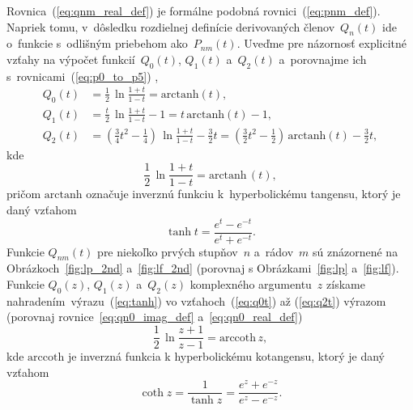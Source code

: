 \documentclass[a4paper, 12pt]{book}
\begin{document}
Rovnica~(\ref{eq:qnm_real_def}) je formálne podobná rovnici~(\ref{eq:pnm_def}).  
Napriek tomu, v~dôsledku rozdielnej definície derivovaných členov~$Q_n(t)$ ide 
o~funkcie s~odlišným priebehom ako~$P_{nm}(t)$.  Uveďme pre názornosť 
explicitné vzťahy na výpočet funkcií~$Q_0\left( t \right)$, $Q_1\left( 
t \right)$ a~$Q_2\left( t \right)$ a~porovnajme ich 
s~rovnicami~(\ref{eq:p0_to_p5})
\parencite{MoritzPhysicalGeodesy},
%
\begin{align}
\label{eq:q0t}
Q_0(t) &= \frac{1}{2} \, \ln\frac{1 + t}{1 - t} = \mathrm{arctanh}(t){,}\\
%
\label{eq:q1t}
Q_1(t) &= \frac{t}{2} \, \ln\frac{1 + t}{1 - t} - 1 = t \, \mathrm{arctanh}(t)- 
 1{,}\\
%
\label{eq:q2t}
Q_2(t) &= \left( \frac{3}{4} t^2 - \frac{1}{4} \right) \, \ln\frac{1 + t}{1 
- t} - \frac{3}{2}t = \left( \frac{3}{2} t^2 - \frac{1}{2} \right) \, 
\mathrm{arctanh}(t) - \frac{3}{2}t{,}
\end{align}
%
kde
%
\begin{equation}
\label{eq:tanh}
\frac{1}{2} \, \ln \frac{1 + t}{1 - t} = \mathrm{arctanh} \, (t){,}
\end{equation}
%
pričom $\mathrm{arctanh}$ označuje inverznú funkciu k~hyperbolickému tangensu, 
ktorý je daný vzťahom \parencite{Gradshteyn2007}
%
\begin{equation}
\tanh t = \frac{e^t - e^{-t}}{e^t + e^{-t}}{.}
\end{equation}
%
Funkcie $Q_{nm}(t)$ pre niekoľko prvých stupňov~$n$ a~rádov~$m$ sú znázornené 
na Obrázkoch~\ref{fig:lp_2nd} a~\ref{fig:lf_2nd} (porovnaj 
s Obrázkami~\ref{fig:lp} a~\ref{fig:lf}).  Funkcie $Q_0\left( z \right)$, 
$Q_1\left( z \right)$ a~$Q_2\left( z \right)$ komplexného argumentu~$z$ získame 
nahradením~výrazu~(\ref{eq:tanh}) vo vzťahoch~(\ref{eq:q0t}) až (\ref{eq:q2t}) 
výrazom (porovnaj rovnice~\ref{eq:qn0_imag_def} a~\ref{eq:qn0_real_def})
%
\begin{equation}
\label{eq:arccoth}
\frac{1}{2} \, \ln \frac{z + 1}{z - 1} = \mathrm{arccoth} \, z{,}
\end{equation}
%
kde $\mathrm{arccoth}$ je inverzná funkcia k hyperbolickému kotangensu, ktorý 
je daný vzťahom \parencite{Gradshteyn2007}
%
\begin{equation}
\coth z = \frac{1}{\tanh z} =  \frac{e^z + e^{-z}}{e^z - e^{-z}}{.}
\end{equation}
\end{document}
